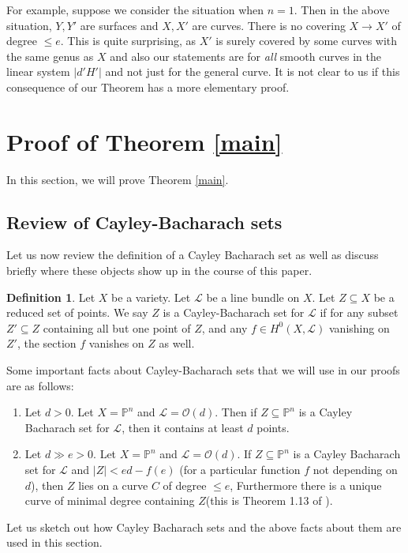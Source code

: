 \documentclass[12pt]{amsart}
\numberwithin{equation}{section}
\numberwithin{theorem}{section}
\theoremstyle{definition}
\theoremstyle{definition}
\newtheorem{definition}[theorem]{Definition}
\def\PP{{\mathbb{P}}}
\def\Lc{{\mathcal{L}}}
\newcommand{\OO}{\mathcal{O}}
\begin{document}
For example, suppose we consider the situation when $n=1$. Then in the above situation, $Y, Y'$ are surfaces and $X, X'$ are curves. There is no covering $X \to X'$ of degree $\le e.$ This is quite surprising, as $X'$ is surely covered by some curves with the same genus as $X$ and also our statements are for \emph{all} smooth curves in the linear system $|d'H'|$ and not just for the general curve. It is not clear to us if this consequence of our Theorem has a more elementary proof.


\section{Proof of Theorem \ref{main}}

In this section, we will prove Theorem \ref{main}.

\subsection{Review of Cayley-Bacharach sets}
Let us now review the definition of a Cayley Bacharach set as well as discuss briefly where these objects show up in the course of this paper. 

\begin{definition}
    Let $X$ be a variety. Let $\Lc$ be a line bundle on $X$. Let $Z \subseteq X$ be a reduced set of points. We say $Z$ is a Cayley-Bacharach set for $\Lc$ if for any subset $Z' \subseteq Z$ containing all but one point of $Z$, and any $f \in H^0(X, \Lc)$ vanishing on $Z'$, the section $f$ vanishes on $Z$ as well.
\end{definition}

Some important facts about Cayley-Bacharach sets that we will use in our proofs are as follows:
\begin{enumerate}
    \item Let $d >0$. Let $X = \PP^n$ and $\Lc = \OO(d)$. Then if $Z \subseteq \PP^n$ is  a Cayley Bacharach set for $\Lc$, then it contains at least $d$ points.
    \item Let $d \gg e >0$.   Let $X = \PP^n$ and $\Lc = \OO(d)$. If $Z \subseteq \PP^n$ is  a Cayley Bacharach set for $\Lc$ and $|Z| < ed- f(e)$ (for a particular function $f$ not depending on $d$), then $Z$ lies on a curve $C$ of degree $\le e$, Furthermore there is a unique curve of minimal degree containing $Z$(this is Theorem 1.13 of \cite{Ban}).
\end{enumerate}

Let us sketch out how Cayley Bacharach sets and the above facts about them are used in this section.
\end{document}
